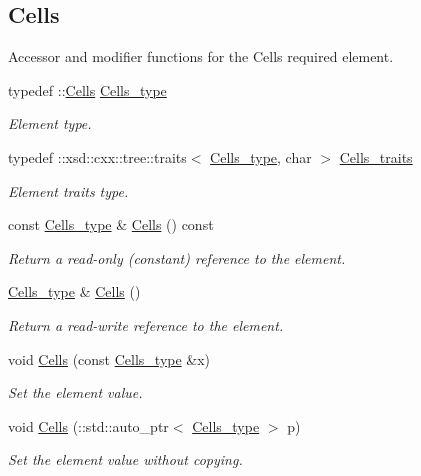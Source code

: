 \subsection*{Cells}
\label{_amgrp56284b76007b9f31cdec47174c4de6af}%
Accessor and modifier functions for the Cells required element. \begin{DoxyCompactItemize}
\item 
typedef \+::\hyperlink{classCells}{Cells} \hyperlink{classPieceUnstructuredGrid__t_aca1ec38eff08bde0cd115c54dbb7a20f}{Cells\+\_\+type}
\begin{DoxyCompactList}\small\item\em Element type. \end{DoxyCompactList}\item 
typedef \+::xsd\+::cxx\+::tree\+::traits$<$ \hyperlink{classPieceUnstructuredGrid__t_aca1ec38eff08bde0cd115c54dbb7a20f}{Cells\+\_\+type}, char $>$ \hyperlink{classPieceUnstructuredGrid__t_a33252b6f55b5ae830ceecdf9be42cce1}{Cells\+\_\+traits}
\begin{DoxyCompactList}\small\item\em Element traits type. \end{DoxyCompactList}\item 
const \hyperlink{classPieceUnstructuredGrid__t_aca1ec38eff08bde0cd115c54dbb7a20f}{Cells\+\_\+type} \& \hyperlink{classPieceUnstructuredGrid__t_a398de7c2f319c1785810e18f6b43831e}{Cells} () const 
\begin{DoxyCompactList}\small\item\em Return a read-\/only (constant) reference to the element. \end{DoxyCompactList}\item 
\hyperlink{classPieceUnstructuredGrid__t_aca1ec38eff08bde0cd115c54dbb7a20f}{Cells\+\_\+type} \& \hyperlink{classPieceUnstructuredGrid__t_a49e65eacff6577cd353fa15a09febf86}{Cells} ()
\begin{DoxyCompactList}\small\item\em Return a read-\/write reference to the element. \end{DoxyCompactList}\item 
void \hyperlink{classPieceUnstructuredGrid__t_a366f0cff854ef350eb1be9da22df6d14}{Cells} (const \hyperlink{classPieceUnstructuredGrid__t_aca1ec38eff08bde0cd115c54dbb7a20f}{Cells\+\_\+type} \&x)
\begin{DoxyCompactList}\small\item\em Set the element value. \end{DoxyCompactList}\item 
void \hyperlink{classPieceUnstructuredGrid__t_ab90d26fbc66b1b669b7bfa7a50a6b069}{Cells} (\+::std\+::auto\+\_\+ptr$<$ \hyperlink{classPieceUnstructuredGrid__t_aca1ec38eff08bde0cd115c54dbb7a20f}{Cells\+\_\+type} $>$ p)
\begin{DoxyCompactList}\small\item\em Set the element value without copying. \end{DoxyCompactList}\end{DoxyCompactItemize}
